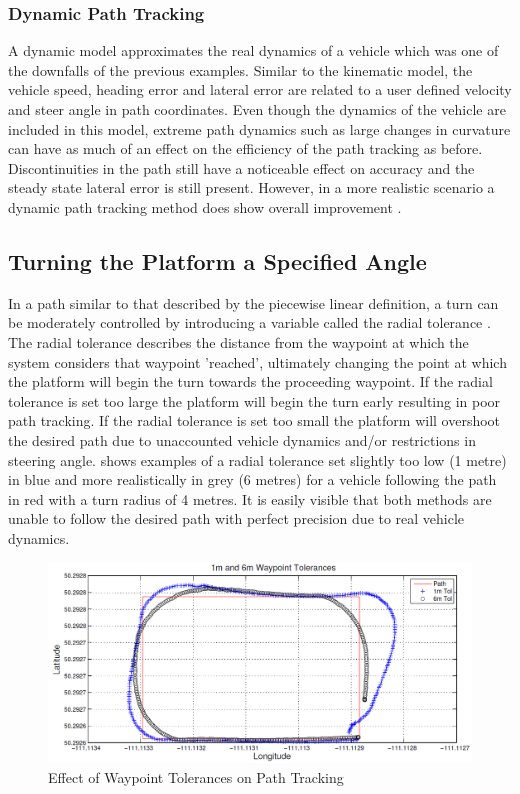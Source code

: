 \documentclass[main.tex]{subfiles}
\begin{document}
\subsubsection{Dynamic Path Tracking}
A dynamic model approximates the real dynamics of a vehicle which was one of the downfalls of the previous examples. Similar to the kinematic model, the vehicle speed, heading error and lateral error are related to a user defined velocity and steer angle in path coordinates. Even though the dynamics of the vehicle are included in this model, extreme path dynamics such as large changes in curvature can have as much of an effect on the efficiency of the path tracking as before\parencite{snider2009}. Discontinuities in the path still have a noticeable effect on accuracy and the steady state lateral error is still present. However, in a more realistic scenario a dynamic path tracking method does show overall improvement \parencite{snider2009}.

\subsection{Turning the Platform a Specified Angle}
In a path similar to that described by the piecewise linear definition, a turn can be moderately controlled by introducing a variable called the radial tolerance \parencite{Giesbrecht2005}. The radial tolerance describes the distance from the waypoint at which the system considers that waypoint 'reached', ultimately changing the point at which the platform will begin the turn towards the proceeding waypoint. If the radial tolerance is set too large the platform will begin the turn early resulting in poor path tracking. If the radial tolerance is set too small the platform will overshoot the desired path due to unaccounted vehicle dynamics and/or restrictions in steering angle.  shows examples of a radial tolerance set slightly too low (1 metre) in blue and more realistically in grey (6 metres) for a vehicle following the path in red with a turn radius of 4 metres. It is easily visible that both methods are unable to follow the desired path with perfect precision due to real vehicle dynamics.

\begin{figure}[ht]
\includegraphics[width=\textwidth]{3-LiteratureReview/waypointTolerances.PNG}
\centering
\caption[Effect of Waypoint Tolerances on Path Tracking]{Effect of Waypoint Tolerances on Path Tracking \parencite{Giesbrecht2005}} 
\end{figure}
\end{document}
